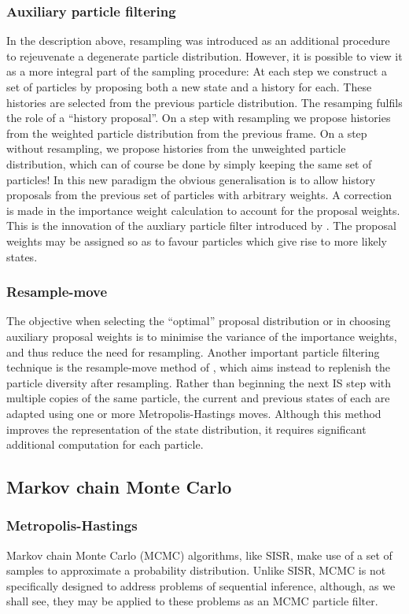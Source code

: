 \subsubsection{Auxiliary particle filtering}
In the description above, resampling was introduced as an additional procedure to rejeuvenate a degenerate particle distribution. However, it is possible to view it as a more integral part of the sampling procedure: At each step we construct a set of particles by proposing both a new state and a history for each. These histories are selected from the previous particle distribution. The resamping fulfils the role of a ``history proposal''. On a step with resampling we propose histories from the weighted particle distribution from the previous frame. On a step without resampling, we propose histories from the unweighted particle distribution, which can of course be done by simply keeping the same set of particles! In this new paradigm the obvious generalisation is to allow history proposals from the previous set of particles with arbitrary weights. A correction is made in the importance weight calculation to account for the proposal weights. This is the innovation of the auxliary particle filter introduced by \cite{Pitt1999}. The proposal weights may be assigned so as to favour particles which give rise to more likely states.

\subsubsection{Resample-move}
The objective when selecting the ``optimal'' proposal distribution or in choosing auxiliary proposal weights is to minimise the variance of the importance weights, and thus reduce the need for resampling. Another important particle filtering technique is the resample-move method of \cite{Gilks2001}, which aims instead to replenish the particle diversity after resampling. Rather than beginning the next IS step with multiple copies of the same particle, the current and previous states of each are adapted using one or more Metropolis-Hastings moves. Although this method improves the representation of the state distribution, it requires significant additional computation for each particle.



\subsection{Markov chain Monte Carlo}

\subsubsection{Metropolis-Hastings}
Markov chain Monte Carlo (MCMC) algorithms, like SISR, make use of a set of samples to approximate a probability distribution. Unlike SISR, MCMC is not specifically designed to address problems of sequential inference, although, as we shall see, they may be applied to these problems as an MCMC particle filter.

